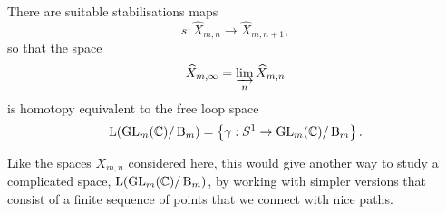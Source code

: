 \begin{conjecture}
  There are suitable stabilisations maps
  \[ s : \widehat{X}_{m,n} \to \widehat{X}_{m,n+1}, \]
  so that the space
  \[ \widehat{X}_{m,\infty} = \varinjlim_n \widehat{X}_{m,n} \]
  is homotopy equivalent to the free loop space
  \[ \mathrm{L}(\operatorname{GL}_m(\mathbb{C})/\operatorname{B}_m) = \left\{  \gamma : S^1 \to
    \operatorname{GL}_m(\mathbb{C})/\operatorname{B}_m  \right\}. \]
\end{conjecture}

Like the spaces $X_{m,n}$ considered here, this would give another way
to study a complicated space, $\mathrm{L}(\operatorname{GL}_m(\mathbb{C})/\operatorname{B}_m)$, by working
with
simpler versions that consist of a finite sequence of points that we
connect with nice paths.

